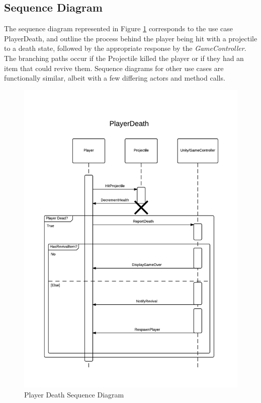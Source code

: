 \documentclass[12pt]{article}       %
\begin{document}
\subsection{Sequence Diagram}
The sequence diagram represented in Figure \ref{PlayerDeath}  corresponds to the use case PlayerDeath, and outline the process behind the player being hit with a projectile to a death state, followed by the appropriate response by the {\it GameController}. The branching paths occur if the Projectile killed the player or if they had an item that could revive them. Sequence diagrams for other use cases are functionally similar, albeit with a few differing actors and method calls.
\begin{figure} [H]
\centering
\includegraphics[width=4.75in]{PlayerDeath.png}
\caption{Player Death Sequence Diagram} \label{PlayerDeath}
\end{figure}
\end{document}
